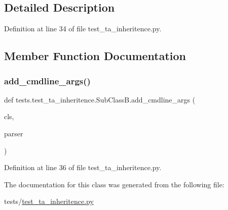 \subsection{Detailed Description}


Definition at line 34 of file test\+\_\+ta\+\_\+inheritence.\+py.



\subsection{Member Function Documentation}
\mbox{\label{classtests_1_1test__ta__inheritence_1_1SubClassB_a9aa7384116305903fbf530d4710e83a3}} 
\subsubsection{\texorpdfstring{add\+\_\+cmdline\+\_\+args()}{add\_cmdline\_args()}}
{\footnotesize\ttfamily def tests.\+test\+\_\+ta\+\_\+inheritence.\+Sub\+Class\+B.\+add\+\_\+cmdline\+\_\+args (\begin{DoxyParamCaption}\item[{}]{cls,  }\item[{}]{parser }\end{DoxyParamCaption})}



Definition at line 36 of file test\+\_\+ta\+\_\+inheritence.\+py.



The documentation for this class was generated from the following file\+:\begin{DoxyCompactItemize}
\item 
tests/\hyperlink{test__ta__inheritence_8py}{test\+\_\+ta\+\_\+inheritence.\+py}\end{DoxyCompactItemize}
